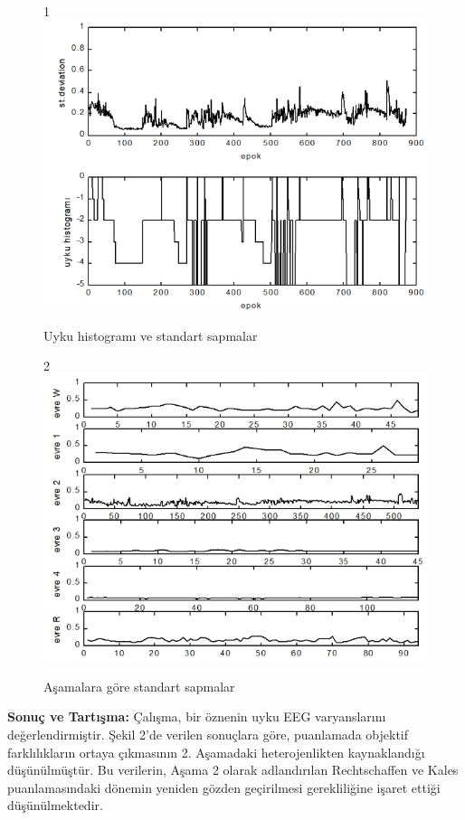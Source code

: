 \documentclass {beamer}
\begin{document}
\begin{frame}

\begin{figure}1
    \centering
    \includegraphics[width=0.75\linewidth]{figure1.png}
    \caption{Uyku histogramı ve standart sapmalar}
    \label{fig:enter-label}
\end{figure}
\end{frame}

\begin{frame}
\begin{figure}2
    \centering
    \includegraphics[width=0.75\linewidth]{figure2.png}
    \caption{Aşamalara göre standart sapmalar}
    \label{fig:enter-label}
\end{figure}
\end{frame}

\begin{frame}
\textbf{Sonuç ve Tartışma:}
Çalışma, bir öznenin uyku EEG varyanslarını değerlendirmiştir. Şekil 2'de verilen sonuçlara göre, puanlamada objektif farklılıkların ortaya çıkmasının 2. Aşamadaki heterojenlikten kaynaklandığı düşünülmüştür. Bu verilerin, Aşama 2 olarak adlandırılan Rechtschaffen ve Kales puanlamasındaki dönemin yeniden gözden geçirilmesi gerekliliğine işaret ettiği düşünülmektedir.
\end{frame}
\end{document}
